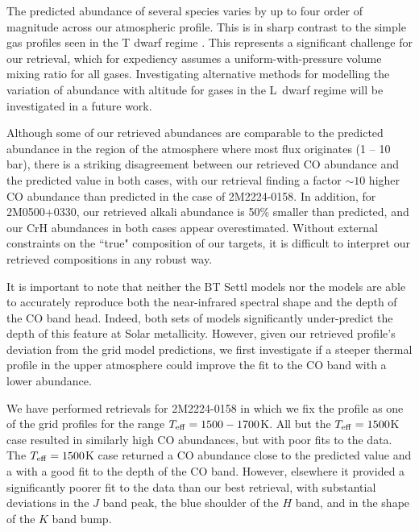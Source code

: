 \documentclass[useAMS,usenatbib]{mn2e}
\begin{document}
The predicted abundance of several species varies by up to four order of magnitude across our atmospheric profile. This is in sharp contrast to the simple gas profiles seen in the T dwarf regime \citep[e.g.][]{line2015}.  This represents a significant challenge for our retrieval, which for expediency assumes a uniform-with-pressure volume mixing ratio for all gases. Investigating alternative methods for modelling the variation of abundance with altitude for gases in the L~dwarf regime will be investigated in a future work.  

Although some of our retrieved abundances are comparable to the predicted abundance in the region of the atmosphere where most flux originates (1 -- 10 bar), there is a striking disagreement between our retrieved CO abundance and the predicted value in both cases, with our retrieval finding a factor $\sim10$ higher CO abundance than predicted in the case of 2M2224-0158. In addition, for 2M0500+0330, our retrieved alkali abundance is 50\% smaller than predicted, and our CrH abundances in both cases appear overestimated. Without external constraints on the ``true" composition of our targets, it is difficult to interpret our retrieved compositions in any robust way.  

It is important to note that neither the BT Settl models \citep{btsettlCS16} nor the \citet{sm08} models are able to accurately reproduce both the near-infrared spectral shape and the depth of the CO band head. Indeed, both sets of models significantly under-predict the depth of this feature at Solar metallicity.  
However, given our retrieved profile's deviation from the grid model predictions, we first investigate if a steeper thermal profile in the upper atmosphere could improve the fit to the CO band with a lower abundance.   

We have performed retrievals for 2M2224-0158 in which we fix the profile as one of the grid profiles for the range $T_{\rm eff} = 1500 - 1700$K.  All but the $T_{\rm eff} = 1500$K case resulted in similarly high CO abundances, but with poor fits to the data. The $T_{\rm eff} = 1500$K case returned a CO abundance close to the predicted value and a with a good fit to the depth of the CO band. However, elsewhere it provided a significantly poorer fit to the data than our best retrieval, with substantial deviations in the $J$ band peak, the blue shoulder of the $H$ band, and in the shape of the $K$ band bump.  
\end{document}
